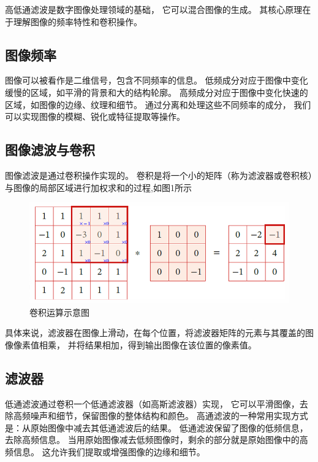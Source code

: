 高低通滤波是数字图像处理领域的基础，
它可以混合图像的生成。
其核心原理在于理解图像的频率特性和卷积操作。

\subsection{图像频率}
图像可以被看作是二维信号，包含不同频率的信息。
低频成分对应于图像中变化缓慢的区域，如平滑的背景和大的结构轮廓。
高频成分对应于图像中变化快速的区域，如图像的边缘、纹理和细节。
通过分离和处理这些不同频率的成分，
我们可以实现图像的模糊、锐化或特征提取等操作。

\subsection{图像滤波与卷积}
图像滤波是通过卷积操作实现的。
卷积是将一个小的矩阵（称为滤波器或卷积核）与图像的局部区域进行加权求和的过程,如图1所示
\begin{figure}
	\centering
	\includegraphics[width=0.7\linewidth]{image/convolution}
	\caption{卷积运算示意图}
	\label{fig:convolution}
\end{figure}


具体来说，滤波器在图像上滑动，在每个位置，将滤波器矩阵的元素与其覆盖的图像像素值相乘，
并将结果相加，得到输出图像在该位置的像素值。

\subsection{滤波器}
低通滤波通过卷积一个低通滤波器（如高斯滤波器）实现，
它可以平滑图像，去除高频噪声和细节，保留图像的整体结构和颜色。
高通滤波的一种常用实现方式是：从原始图像中减去其低通滤波后的结果。
低通滤波保留了图像的低频信息，去除高频信息。
当用原始图像减去低频图像时，剩余的部分就是原始图像中的高频信息。
这允许我们提取或增强图像的边缘和细节。

